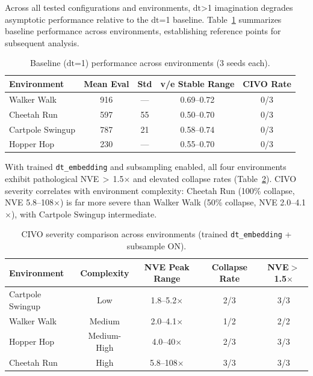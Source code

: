 \documentclass{article}
\newcommand{\dt}{\mathrm{dt}}
\begin{document}
Across all tested configurations and environments, $\dt$>1 imagination degrades asymptotic performance relative to the $\dt$=1 baseline.
Table~\ref{tab:cross-env-baseline} summarizes baseline performance across environments, establishing reference points for subsequent analysis.

\begin{table}[h]
\centering
\caption{Baseline ($\dt$=1) performance across environments (3 seeds each).}
\label{tab:cross-env-baseline}
\begin{tabular}{lcccc}
\toprule
\textbf{Environment} & \textbf{Mean Eval} & \textbf{Std} & \textbf{v/e Stable Range} & \textbf{CIVO Rate} \\
\midrule
Walker Walk & 916 & --- & 0.69--0.72 & 0/3 \\
Cheetah Run & 597 & 55 & 0.50--0.70 & 0/3 \\
Cartpole Swingup & 787 & 21 & 0.58--0.74 & 0/3 \\
Hopper Hop & 230 & --- & 0.55--0.70 & 0/3 \\
\bottomrule
\end{tabular}
\end{table}

With trained \texttt{dt\_embedding} and subsampling enabled, all four environments exhibit pathological NVE\,$>$\,1.5$\times$ and elevated collapse rates (Table~\ref{tab:cross-env-civo}).
CIVO severity correlates with environment complexity: Cheetah Run (100\% collapse, NVE 5.8--108$\times$) is far more severe than Walker Walk (50\% collapse, NVE 2.0--4.1$\times$), with Cartpole Swingup intermediate.

\begin{table}[h]
\centering
\caption{CIVO severity comparison across environments (trained \texttt{dt\_embedding} + subsample ON).}
\label{tab:cross-env-civo}
\begin{tabular}{lcccc}
\toprule
\textbf{Environment} & \textbf{Complexity} & \textbf{NVE Peak Range} & \textbf{Collapse Rate} & \textbf{NVE$>$1.5$\times$} \\
\midrule
Cartpole Swingup & Low & 1.8--5.2$\times$ & 2/3 & 3/3 \\
Walker Walk & Medium & 2.0--4.1$\times$ & 1/2 & 2/2 \\
Hopper Hop & Medium-High & 4.0--40$\times$ & 2/3 & 3/3 \\
Cheetah Run & High & 5.8--108$\times$ & 3/3 & 3/3 \\
\bottomrule
\end{tabular}
\end{table}
\end{document}
